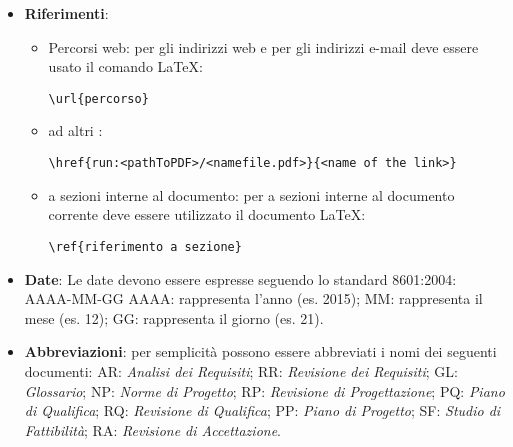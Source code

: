 \documentclass{scalatekids-article}
\begin{document}
\begin{itemize}
    \item \textbf{Riferimenti}:
        \begin{itemize}
            \item Percorsi web: per gli indirizzi web e per gli indirizzi e-mail deve essere usato il comando \LaTeX\xspace:
                \begin{center}
                    \verb=\url{percorso}=
                \end{center}
            \item {} ad altri :
                \begin{center}
                    \verb=\href{run:<pathToPDF>/<namefile.pdf>}{<name of the link>}=
                \end{center}
            \item {} a sezioni interne al documento: per  a sezioni interne al documento corrente deve essere utilizzato il documento \LaTeX\xspace:
                \begin{center}
                    \verb=\ref{riferimento a sezione}=
                \end{center}
        \end{itemize}
    \item \textbf{Date}: Le date devono essere espresse seguendo lo standard \textit{} 8601:2004:
        AAAA-MM-GG
        AAAA: rappresenta l'anno (es. 2015);
        MM:	rappresenta il mese (es. 12);
        GG: rappresenta il giorno (es. 21).

    \item \textbf{Abbreviazioni}: per semplicità possono essere abbreviati i nomi dei seguenti documenti:
        AR: \textit{Analisi dei Requisiti};
        RR: \textit{Revisione dei Requisiti};
        GL: \textit{Glossario};
        NP: \textit{Norme di Progetto};
        RP: \textit{Revisione di Progettazione};
        PQ: \textit{Piano di Qualifica};
        RQ: \textit{Revisione di Qualifica};
        PP: \textit{Piano di Progetto};
        SF: \textit{Studio di Fattibilità};
        RA: \textit{Revisione di Accettazione}.


\end{itemize}
\end{document}

